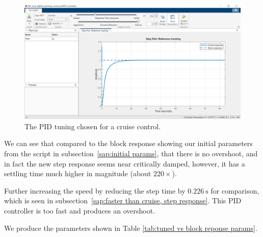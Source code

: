 \documentclass[12pt]{article}
\begin{document}
\begin{figure}
    \centering
    \includegraphics[width=\linewidth]{img/task07_020_cruise_control.png}
    \caption{The PID tuning chosen for a cruise control.}
    \label{fig:task07_020_cruise_control}
\end{figure}

We can see that compared to the block response showing our initial parameters from the script in  subsection~\ref{sap:initial params},
that there is no overshoot,
and in fact the new step response seems near critically damped,
however, it has a settling time much higher in magnitude (about $220\times$).

Further increasing the speed by reducing the step time by $\SI{0.226}\second$ for comparison, which is seen in  subsection~\ref{sap:faster than cruise, step response}.
This PID controller is too fast and produces an overshoot.

We produce the parameters shown in Table \ref{tab:tuned vs block reponse params}.
\end{document}
